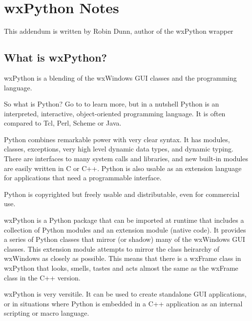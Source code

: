 \chapter{wxPython Notes}\label{wxPython}

%
\setfooter{\thepage}{}{}{}{}{\thepage}%

This addendum is written by Robin Dunn, author of the wxPython wrapper

\section{What is wxPython?}\label{wxpwhat}

wxPython is a blending of the wxWindows GUI classes and the
 programming language.


So what is Python?  Go to
 to learn more,
but in a nutshell Python is an interpreted,
interactive, object-oriented programming language. It is often
compared to Tcl, Perl, Scheme or Java.

Python combines remarkable power with very clear syntax. It has
modules, classes, exceptions, very high level dynamic data types, and
dynamic typing. There are interfaces to many system calls and
libraries, and new built-in modules are easily written in C or
C++. Python is also usable as an extension language for applications
that need a programmable interface.

Python is copyrighted but freely usable and distributable, even for
commercial use.


wxPython is a Python package that can be imported at runtime that
includes a collection of Python modules and an extension module
(native code). It provides a series of Python classes that mirror (or
shadow) many of the wxWindows GUI classes. This extension module
attempts to mirror the class heirarchy of wxWindows as closely as
possible. This means that there is a wxFrame class in wxPython that
looks, smells, tastes and acts almost the same as the wxFrame class in
the C++ version.

wxPython is very versitile. It can be used to create standalone GUI
applications, or in situations where Python is embedded in a C++
application as an internal scripting or macro language.

